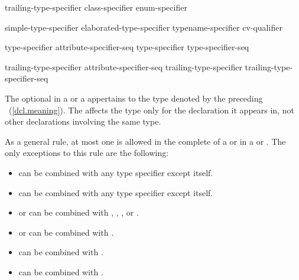 %
%
%
\begin{bnf}
\br
    trailing-type-specifier\br
    class-specifier\br
    enum-specifier
\end{bnf}

\begin{bnf}
\br
  simple-type-specifier\br
  elaborated-type-specifier\br
  typename-specifier\br
  cv-qualifier
\end{bnf}

\begin{bnf}
\br
    type-specifier attribute-specifier-seq\opt\br
    type-specifier type-specifier-seq
\end{bnf}

\begin{bnf}
\br
  trailing-type-specifier attribute-specifier-seq\opt\br
  trailing-type-specifier trailing-type-specifier-seq
\end{bnf}

The optional  in a 
or a 
appertains
to the type denoted by the preceding ~(\ref{dcl.meaning}). The
 affects the type only for the declaration it appears in,
not other declarations involving the same type.

\pnum
As a general rule, at most one  is allowed in the complete
 of a  or in a
 or .
The only exceptions to this rule are the following:

\begin{itemize}
\item {} can be combined with any type specifier except itself.

\item {} can be combined with any type specifier except itself.

\item {} or  can be combined with
, , , or .

\item {} or  can be combined with .

\item {} can be combined with .

\item {} can be combined with .
\end{itemize}

